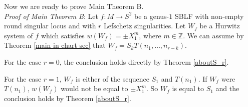 \documentclass{amsart}
\theoremstyle{plain}
\theoremstyle{definition}
\begin{document}
\par

Now we are ready to prove Main Theorem B. 
\\[5pt]
{\it Proof of Main Theorem B}: Let $f:M\rightarrow S^2$ be a genus-$1$ SBLF with non-empty round singular locus and with $r$ Lefschetz singularities. 
Let $W_f$ be a Hurwitz system of $f$ which satisfies $w(W_f)=\pm X_1^m$, where $m\in\mathbb{Z}$. 
We can assume by Theorem \ref{main in chart sec} that $W_f=S_kT(n_1,\ldots,n_{r-k})$. 
\par

For the case $r=0$, the conclusion holds directly by Theorem \ref{aboutS_r}. 

\par

For the case $r=1$, $W_f$ is either of the sequence $S_1$ and $T(n_1)$. 
If $W_f$ were $T(n_1)$, $w(W_f)$ would not be equal to $\pm X_1^m$. 
So $W_f$ is equal to $S_1$ and the conclusion holds by Theorem \ref{aboutS_r}. 

\par
\end{document}
